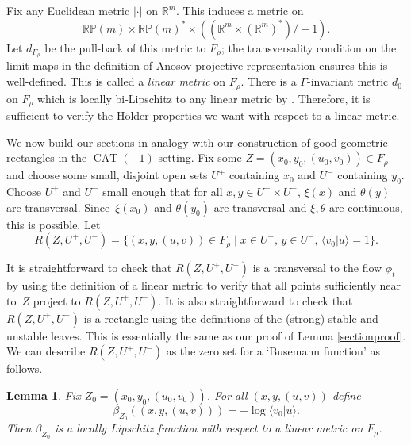 \documentclass[JEP,XML,SOM,Unicode,NoFloatCountersInSection]{cedram}
\let\sep\mid
\newtheorem{lem}[thm]{Lemma}
\theoremstyle{definition}
\numberwithin{equation}{section}
\DeclareMathOperator{\CAT}{CAT}
\begin{document}
Fix any Euclidean metric $|\cdot|$ on $\mathbb{R}^m$. This induces a metric on\vspace*{-3pt}\enlargethispage{\baselineskip}%
\[ \mathbb{RP}(m) \times \mathbb{RP}(m)^* \times ((\mathbb{R}^m \times (\mathbb{R}^m)^*)/\pm1).\]
Let $d_{F_\rho}$ be the pull-back of this metric to $F_\rho$; the transversality condition on the limit maps in the definition of Anosov projective representation ensures this is well-defined. This is called a \emph{linear metric} on $F_\rho$. There is a $\Gamma$-invariant metric $d_0$ on $F_\rho$ which is locally bi-Lipschitz to any linear metric by \cite[Lem.\,5.2]{bcls}. Therefore, it is sufficient to verify the Hölder properties we want with respect to a linear metric.

We now build our sections in analogy with our construction of good geometric rectangles in the $\CAT(-1)$ setting. Fix some $Z = (x_0,y_0,(u_0,v_0)) \in F_\rho$ and choose some small, disjoint open sets $U^+$ containing $x_0$ and $U^-$ containing $y_0$. Choose $U^+$ and $U^-$ small enough that for all $x,y\in U^+\times U^-$, $\xi(x)$ and $\theta(y)$ are transversal. Since~$\xi(x_0)$ and $\theta(y_0)$ are transversal and $\xi, \theta$ are continuous, this is possible.
Let
\[ R(Z,U^+,U^-) = \{ (x,y,(u,v))\in F_\rho \sep x\in U^+,\, y\in U^-,\, \langle v_0 | u \rangle =1\}.\]

It is straightforward to check that $R(Z,U^+,U^-)$ is a transversal to the flow $\phi_t$ by using the definition of a linear metric to verify that all points sufficiently near to~$Z$ project to $R(Z,U^+,U^-)$. It is also straightforward to check that $R(Z,U^+,U^-)$ is a rectangle using the definitions of the (strong) stable and unstable leaves. This is essentially the same as our proof of Lemma \ref{sectionproof}. We can describe $R(Z,U^+,U^-)$ as the zero set for a `Busemann function' as follows.

\begin{lem}\label{lem:beta Lipschitz}
Fix $Z_0=(x_0,y_0,(u_0,v_0))$. For all $(x,y,(u,v))$ define\vspace*{-3pt}
\[ \beta_{Z_0}((x,y,(u,v))) = -\log\langle v_0 | u\rangle.\]
Then $\beta_{Z_0}$ is a locally Lipschitz function with respect to a linear metric on $F_\rho$.
\end{lem}
\end{document}
